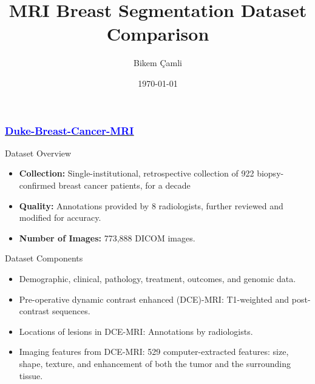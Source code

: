 \documentclass{beamer}
\begin{document}
    \title{MRI Breast Segmentation Dataset Comparison}
    \author{Bikem Çamli}
    \date{\today}


    \frame{\titlepage}
    \begin{frame}
        \frametitle{ \href{https://nbia.cancerimagingarchive.net/viewer/?study=1.3.6.1.4.1.14519.5.2.1.295822356709841808204887570788704838212&series=1.3.6.1.4.1.14519.5.2.1.210143579418064304537763273309118865786&token=d3ebb6d2-30da-48d5-a295-0a4fa82d310a}{\underline{\textcolor{blue}{Duke-Breast-Cancer-MRI}}}}

        \begin{block}{Dataset Overview}
            \begin{itemize}
                \item \textbf{Collection:} Single-institutional, retrospective collection of 922 biopsy-confirmed breast cancer patients, for a decade
                \item \textbf{Quality:} Annotations provided by 8 radiologists, further reviewed and modified for accuracy.
                \item \textbf{Number of Images:} 773,888 DICOM images.
            \end{itemize}
        \end{block}

        \begin{block}{Dataset Components}
            \begin{itemize}
                \item Demographic, clinical, pathology, treatment, outcomes, and genomic data.
                \item Pre-operative dynamic contrast enhanced (DCE)-MRI: T1-weighted and post-contrast sequences.
                \item Locations of lesions in DCE-MRI: Annotations by radiologists.
                \item Imaging features from DCE-MRI: 529 computer-extracted features: size, shape, texture, and enhancement of both the tumor and the surrounding tissue.
            \end{itemize}
        \end{block}
    \end{frame}
\end{document}
